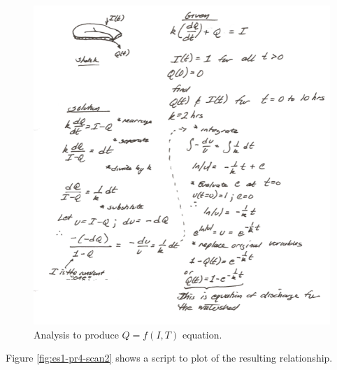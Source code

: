 \documentclass[12pt]{article}
\begin{document}
\begin{enumerate}
\begin{figure}[h!] %
   \centering
   \includegraphics[width=5.5in]{es1-pr4-scan1.png} 
   \caption{Analysis to produce $Q=f(I,T)$ equation.}
   \label{fig:es1-pr4-scan1}
\end{figure}

\clearpage

Figure \ref{fig:es1-pr4-scan2} shows a script to plot of the resulting relationship.


\end{enumerate}
\end{document}
